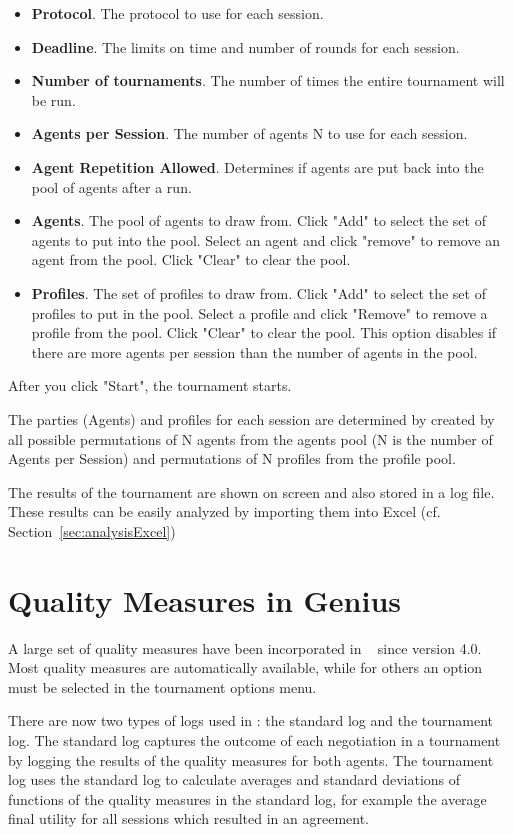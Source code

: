 \documentclass[]{article}
\begin{document}
\begin{itemize}
	\item \textbf{Protocol}. The protocol to use for each session.
	\item \textbf{Deadline}. The limits on time and number of rounds for each session.
	\item \textbf{Number of tournaments}. The number of times the entire tournament will be run.
	\item \textbf{Agents per Session}. The number of agents N to use for each session.
	\item \textbf{Agent Repetition Allowed}. Determines if agents are put back into the pool of agents after a run.
	\item \textbf{Agents}. The pool of agents to draw from. Click "Add" to select the set of agents to put into the pool. Select an agent and click "remove" to remove an agent from the pool. Click "Clear" to clear the pool.
	\item \textbf{Profiles}. The set of profiles to draw from. Click "Add" to select the set of profiles to put in the pool. Select a profile and click "Remove" to remove a profile from the pool. Click "Clear" to clear the pool. This option disables if there are more agents per session than the number of agents in the pool.
\end{itemize}

After you click "Start", the tournament starts. 

The parties (Agents) and profiles for each session are determined by created by all possible permutations of N agents from the agents pool (N is the number of Agents per Session) and permutations of N profiles from the profile pool. 
		
The results of the tournament are shown on screen and also stored in a log file.  These results can be easily analyzed by importing them into Excel (cf. Section~\ref{sec:analysisExcel})
	




\section{Quality Measures in Genius}\label{sec:qm}
A large set of quality measures have been incorporated in \Genius~ since version 4.0. Most quality measures are automatically available, while for others an option must be selected in the tournament options menu.

There are now two types of logs used in \Genius: the standard log and the tournament log. The standard log captures the outcome of each negotiation in a tournament by logging the results of the quality measures for both agents. The tournament log uses the standard log to calculate averages and standard deviations of functions of the quality measures in the standard log, for example the average final utility for all sessions which resulted in an agreement.
\end{document}
